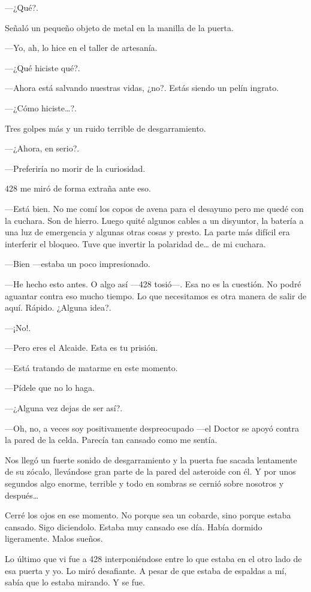 ---¿Qué?.

Señaló un pequeño objeto de metal en la manilla de la puerta.

---Yo, ah, lo hice en el taller de artesanía.

---¿Qué hiciste qué?.

---Ahora está salvando nuestras vidas, ¿no?. Estás siendo un pelín
ingrato.

---¿Cómo hiciste\ldots{}?.

Tres golpes más y un ruido terrible de desgarramiento.

---¿Ahora, en serio?.

---Preferiría no morir de la curiosidad.

428 me miró de forma extraña ante eso.

---Está bien. No me comí los copos de avena para el desayuno pero me
quedé con la cuchara. Son de hierro. Luego quité algunos cables a un
disyuntor, la batería a una luz de emergencia y algunas otras cosas y
presto. La parte más difícil era interferir el bloqueo. Tuve que
invertir la polaridad de\ldots{} de mi cuchara.

---Bien ---estaba un poco impresionado.

---He hecho esto antes. O algo así ---428 tosió---. Esa no es la
cuestión. No podré aguantar contra eso mucho tiempo. Lo que necesitamos
es otra manera de salir de aquí. Rápido. ¿Alguna idea?.

---¡No!.

---Pero eres el Alcaide. Esta es tu prisión.

---Está tratando de matarme en este momento.

---Pídele que no lo haga.

---¿Alguna vez dejas de ser así?.

---Oh, no, a veces soy positivamente despreocupado ---el Doctor se apoyó
contra la pared de la celda. Parecía tan cansado como me sentía.

Nos llegó un fuerte sonido de desgarramiento y la puerta fue sacada
lentamente de su zócalo, llevándose gran parte de la pared del asteroide
con él. Y por unos segundos algo enorme, terrible y todo en sombras se
cernió sobre nosotros y después\ldots{}

Cerré los ojos en ese momento. No porque sea un cobarde, sino porque
estaba cansado. Sigo diciendolo. Estaba muy cansado ese día. Había
dormido ligeramente. Malos sueños.

Lo último que vi fue a 428 interponiéndose entre lo que estaba en el
otro lado de esa puerta y yo. Lo miró desafiante. A pesar de que estaba
de espaldas a mí, sabía que lo estaba mirando. Y se fue.

